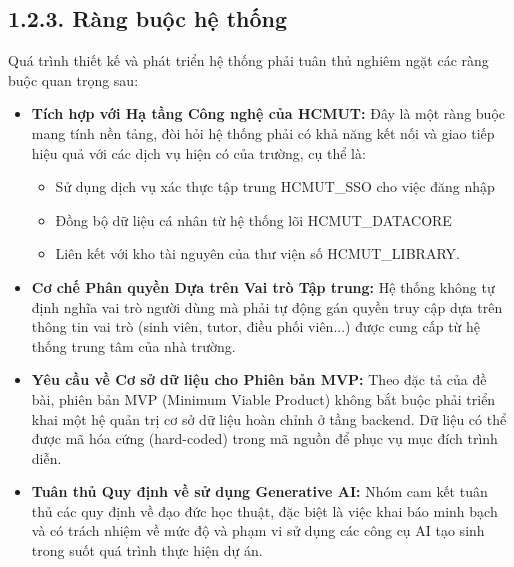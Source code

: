 \subsection*{1.2.3. Ràng buộc hệ thống}
Quá trình thiết kế và phát triển hệ thống phải tuân thủ nghiêm ngặt các ràng buộc quan trọng sau:
\begin{itemize}
    \item \textbf{Tích hợp với Hạ tầng Công nghệ của HCMUT:} Đây là một ràng buộc mang tính nền tảng, đòi hỏi hệ thống phải có khả năng kết nối và giao tiếp hiệu quả với các dịch vụ hiện có của trường, cụ thể là:

    \begin{itemize}
        \item Sử dụng dịch vụ xác thực tập trung HCMUT\_SSO cho việc đăng nhập
        \item Đồng bộ dữ liệu cá nhân từ hệ thống lõi HCMUT\_DATACORE
        \item Liên kết với kho tài nguyên của thư viện số HCMUT\_LIBRARY.
    \end{itemize}
    \item \textbf{Cơ chế Phân quyền Dựa trên Vai trò Tập trung:} Hệ thống không tự định nghĩa vai trò người dùng mà phải tự động gán quyền truy cập dựa trên thông tin vai trò (sinh viên, tutor, điều phối viên...) được cung cấp từ hệ thống trung tâm của nhà trường.
    \item \textbf{Yêu cầu về Cơ sở dữ liệu cho Phiên bản MVP:} Theo đặc tả của đề bài, phiên bản MVP (Minimum Viable Product) không bắt buộc phải triển khai một hệ quản trị cơ sở dữ liệu hoàn chỉnh ở tầng backend. Dữ liệu có thể được mã hóa cứng (hard-coded) trong mã nguồn để phục vụ mục đích trình diễn.
    \item \textbf{Tuân thủ Quy định về sử dụng Generative AI:} Nhóm cam kết tuân thủ các quy định về đạo đức học thuật, đặc biệt là việc khai báo minh bạch và có trách nhiệm về mức độ và phạm vi sử dụng các công cụ AI tạo sinh trong suốt quá trình thực hiện dự án.

\end{itemize}

